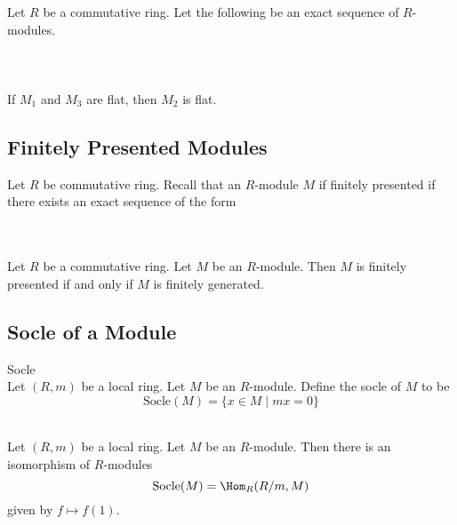 \documentclass[a4paper]{article}
\begin{document}
\begin{prp}{}{} Let $R$ be a commutative ring. Let the following be an exact sequence of $R$-modules. \\~\\
\\~\\
If $M_1$ and $M_3$ are flat, then $M_2$ is flat. 
\end{prp}

\subsection{Finitely Presented Modules}
Let $R$ be commutative ring. Recall that an $R$-module $M$ if finitely presented if there exists an exact sequence of the form \\~\\
 \\

\begin{lmm}{}{} Let $R$ be a commutative ring. Let $M$ be an $R$-module. Then $M$ is finitely presented if and only if $M$ is finitely generated. 
\end{lmm}

\subsection{Socle of a Module}
\begin{defn}{Socle}{}\\
Let $(R,m)$ be a local ring. Let $M$ be an $R$-module. Define the socle of $M$ to be $$\text{Socle}(M)=\{x\in M\;|\;mx=0\}$$
\end{defn}

\begin{lmm}{}{}\\
Let $(R,m)$ be a local ring. Let $M$ be an $R$-module. Then there is an isomorphism of $R$-modules $$\text{Socle}(M)=\Hom_R(R/m,M)$$ given by $f\mapsto f(1)$. 
\end{lmm}
\end{document}
